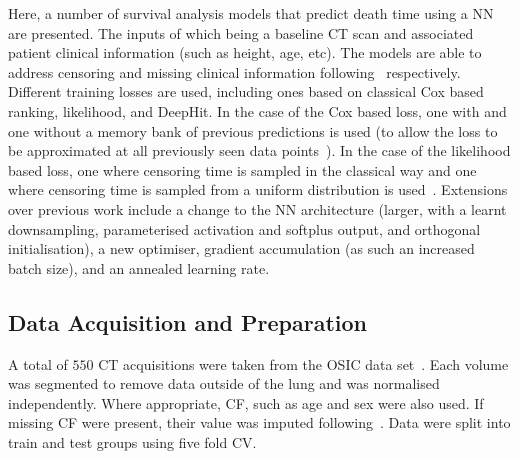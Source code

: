         Here, a number of survival analysis models that predict death time using a \gls{NN} are presented. The inputs of which being a baseline \gls{CT} scan and associated patient clinical information (such as height, age, etc). The models are able to address censoring and missing clinical information following~\parencite{Shahin2023DeepAnalysis, Shahin2022SurvivalData} respectively. Different training losses are used, including ones based on classical Cox based ranking, likelihood, and DeepHit. In the case of the Cox based loss, one with and one without a memory bank of previous predictions is used (to allow the loss to be approximated at all previously seen data points~\parencite{Shahin2022SurvivalData}). In the case of the likelihood based loss, one where censoring time is sampled in the classical way and one where censoring time is sampled from a uniform distribution is used~\parencite{Shahin2023DeepAnalysis}. Extensions over previous work include a change to the \gls{NN} architecture (larger, with a learnt downsampling, parameterised activation and softplus output, and orthogonal initialisation), a new optimiser, gradient accumulation (as such an increased batch size), and an annealed learning rate.
        \subsection{Data Acquisition and Preparation} \label{sec:deep_learning_for_ct_based_survival_analysis_of_idiopathic_pulmonary_fibrosis_patients_appendix_data_acquisition_and_preparation}
            A total of $550$ \gls{CT} acquisitions were taken from the \gls{OSIC} data set~\parencite{OSICOSICRepository}. Each volume was segmented to remove data outside of the lung and was normalised independently. Where appropriate, \gls{CF}, such as age and sex were also used. If missing \gls{CF} were present, their value was imputed following~\parencite{Shahin2022SurvivalData}. Data were split into train and test groups using five fold \gls{CV}.

